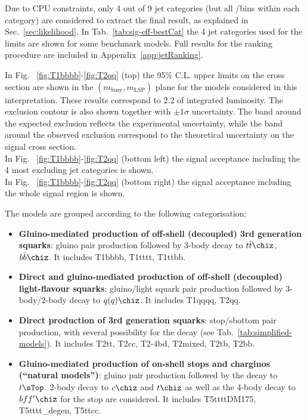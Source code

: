 Due to CPU constraints, only 4 out of 9 jet categories (but all \nb/\scalht bins
within each category) are considered to extract the final result, as explained in Sec.~\ref{sec:likelihood}. 
In Tab.~\ref{tab:sig-eff-bestCat} the 4 jet categories used for the limits are shown for some benchmark models. 
Full results for the ranking procedure are included in Appendix~\ref{app:jetRanking}. 

In Fig. ~\ref{fig:T1bbbb}-\ref{fig:T2qq} (top) the 95\% C.L. upper limits on the cross section are shown 
in the $(m_{\mathrm{Susy}},m_{\mathrm{LSP}})$ plane for the models considered in this interpretation. 
These results correspond to 2.2 \ifb of integrated luminosity. 
The exclusion contour is also shown together with $\pm1\sigma$ uncertainty. 
The band around the expected exclusion reflects the experimental uncertainty, 
while the band around the observed exclusion correspond to the theoretical 
uncertainty on the signal cross section.\\
In Fig. ~\ref{fig:T1bbbb}-\ref{fig:T2qq} (bottom left) the signal acceptance 
including the 4 most excluding jet categories is shown. \\
In Fig. ~\ref{fig:T1bbbb}-\ref{fig:T2qq} (bottom right) the signal acceptance 
including the whole signal region is shown.

The models are grouped according to the following categorisation:
\begin{itemize}
\item \textbf{Gluino-mediated production of off-shell (decoupled) 3rd generation squarks}: gluino pair production followed by 3-body decay to $t\bar{t}\chiz$,$b\bar{b}\chiz$. 
  It includes T1bbbb, T1tttt, T1ttbb. 
\item \textbf{Direct and gluino-mediated production of off-shell (decoupled) light-flavour squarks}: gluino/light squark pair production followed by 3-body/2-body decay to $q(q)\chiz$. 
  It includes T1qqqq, T2qq. 
\item \textbf{Direct production of 3rd generation squarks}: stop/sbottom pair production, with several possibility for the decay (see Tab.~\ref{tab:simplified-models}). 
  It includes T2tt, T2cc, T2-4bd, T2mixed, T2tb, T2bb. 
\item \textbf{Gluino-mediated production of on-shell stops and charginos (``natural models'')}: gluino pair production followed by the decay to $t\sTop$. 2-body decay to $c\chiz$ and $t\chiz$ as well as  
  the 4-body decay to $bff'\chiz$ for the stop are considered. It includes T5ttttDM175, T5tttt\_degen, T5ttcc. 
\end{itemize} 

